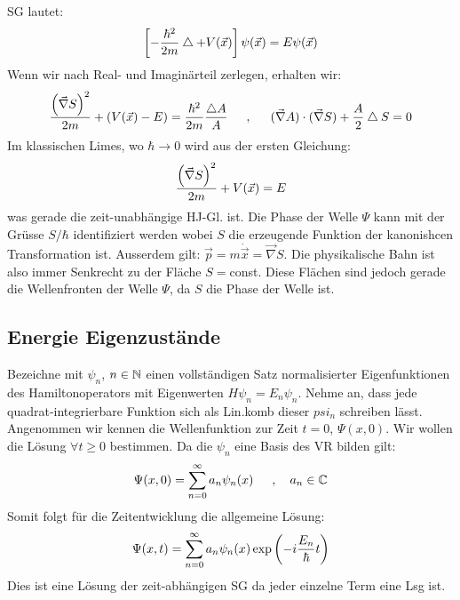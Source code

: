 SG lautet:
\begin{align*}
    \left[ - \frac{\hbar^2}{2 m} \bigtriangleup + V(\vec{x}) \right]\psi(\vec{x}) = E \psi(\vec{x})
\end{align*}
Wenn wir nach Real- und Imaginärteil zerlegen, erhalten wir:
\begin{align*}
    \frac{\left( \vec{\nabla} S \right)^2}{2 m} + \left( V(\vec{x}) - E \right)
    = \frac{\hbar^2}{2m} \frac{\bigtriangleup A}{A}
    \hspace{15pt} , \hspace{15pt}
    (\vec{\nabla} A) \cdot (\vec{\nabla} S) + \frac{A}{2} \bigtriangleup S = 0
\end{align*}
Im klassischen Limes, wo $\hbar \rightarrow 0$ wird aus der ersten Gleichung:
\begin{align*}
    \frac{\left( \vec{\nabla} S \right)^2}{2 m} + V(\vec{x}) = E
\end{align*}
was gerade die zeit-unabhängige HJ-Gl. ist. Die Phase der Welle $\Psi$ kann
mit der Grüsse $S/\hbar$ identifiziert werden wobei $S$ die erzeugende
Funktion der kanonishcen Transformation ist. Ausserdem gilt: $\vec{p} = m
\dot{\vec{x}} = \vec{\nabla} S$. Die physikalische Bahn ist also immer
Senkrecht zu der Fläche $S =$const. Diese Flächen sind jedoch gerade die
Wellenfronten der Welle $\Psi$, da $S$ die Phase der Welle ist.

\subsection{Energie Eigenzustände}
Bezeichne mit $\psi_n$, $n \in \mathbb{N}$ einen vollständigen Satz normalisierter
Eigenfunktionen des Hamiltonoperators mit Eigenwerten $H \psi_n = E_n \psi_n$.
Nehme an, dass jede quadrat-integrierbare Funktion sich als Lin.komb dieser
$psi_n$ schreiben lässt. Angenommen wir kennen die Wellenfunktion zur Zeit
$t=0$, $\Psi(x,0)$. Wir wollen die Lösung $\forall t \geq 0$ bestimmen. Da
die $\psi_n$ eine Basis des VR bilden gilt:
\begin{align*}
    \Psi(x,0) = \sum_{n=0}^\infty a_n \psi_n (x)
    \hspace{15pt} , \hspace{10pt} a_n \in \mathbb{C}
\end{align*}
Somit folgt für die Zeitentwicklung die allgemeine Lösung:
\begin{align}\label{SolSGgeneral}
    \Psi(x,t) = \sum_{n=0}^\infty a_n \psi_n (x) \exp \left( -i \frac{E_n}{\hbar} t \right)
\end{align}
Dies ist eine Lösung der zeit-abhängigen SG da jeder einzelne Term eine Lsg ist.

